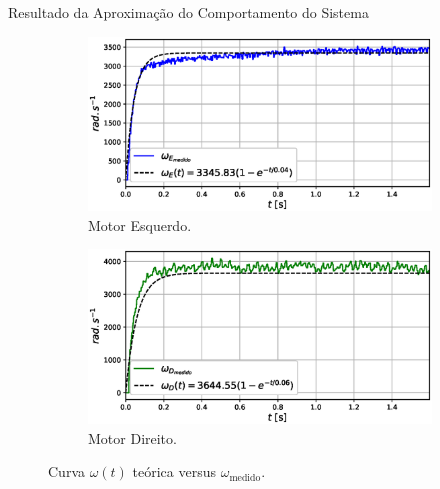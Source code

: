 \begin{frame}{Resultado da Aproximação do Comportamento do Sistema}


\begin{figure}
    \begin{subfigure}{.45\textwidth}
        \centering
        \includegraphics[width=\textwidth]{figuras/resultados/exp04/regressao_vs_medido_esquerdo100.eps}
        \caption{Motor Esquerdo.}
    \end{subfigure}
    \begin{subfigure}{.45\textwidth}
        \centering
        \includegraphics[width=\textwidth]{figuras/resultados/exp04/regressao_vs_medido_direito100.eps}
        \caption{Motor Direito.}
    \end{subfigure}
    \caption{Curva $\omega(t)$ teórica versus $\omega_{\text{medido}}$.}
\end{figure}
    
\end{frame}


